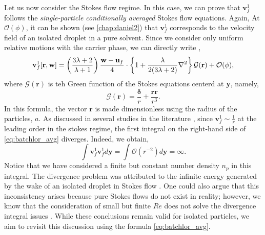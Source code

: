 Let us now consider the Stokes flow regime. 
In this case, we can prove that $\textbf{v}_f^{1}$ follows the \textit{single-particle conditionally averaged} Stokes flow equations. 
Again, At $\mathcal{O}(\phi)$, it can be shown (see \ref{chap:daniel2}) that $\textbf{v}^1_f$ corresponds to the velocity field of an isolated droplet in a pure solvent. 
Since we consider only uniform relative motions with the carrier phase, we can directly write \citep{kim2013microhydrodynamics}, 
\begin{equation}
    \textbf{v}_f^{1}[\textbf{r},\textbf{w}]
    = 
    \left(\frac{3\lambda + 2}{\lambda +1}\right)\frac{\textbf{w}- \textbf{u}_f}{4}\cdot
    \left\{
        1
        + 
        \frac{\lambda}{2(3\lambda +2)}\grad^2
    \right\}\mathcal{G}(\textbf{r})
    + \mathcal{O}(\phi),
    \label{eq:stokes_sol}
\end{equation}
where $\mathcal{G}(\textbf{r})$ is teh Green function of the Stokes equations centerd at \textbf{y}, namely, 
\begin{equation}
    \mathcal{G}(\textbf{r}) = \frac{\bm\delta}{r} + \frac{\textbf{rr}}{r^3} .
\end{equation}
In this formula, the vector $\textbf{r}$ is made dimensionless using the radius of the particles, $a$. 
As discussed in several studies in the literature \citep{caflisch1985variance}, 
since $\textbf{v}_f^{1} \sim \frac{1}{r}$ at the leading order in the stokes regime, the first integral on the right-hand side of \ref{eq:batchlor_avg} diverges. 
Indeed, we obtain,
\begin{equation}
    \int \textbf{v}_f^{1} \textbf{v}_f^{1}  d \textbf{y} = 
    \int \mathcal{O}(r^{-2}) d \textbf{y} = \infty.
    \label{eq:non_convergence}
\end{equation}
Notice that we have considered a finite but constant number density $n_p$ in this integral. 
The divergence problem was attributed to the infinite energy generated by the wake of an isolated droplet in Stokes flow \citep{caflisch1985variance}. 
One could also argue that this inconsistency arises because pure Stokes flows do not exist in reality; however, we know that the consideration of small but finite $Re$ does not solve the divergence integral issues \citep{koch1993hydrodynamic}. 
While these conclusions remain valid for isolated particles, we aim to revisit this discussion using the formula \ref{eq:batchlor_avg}.

